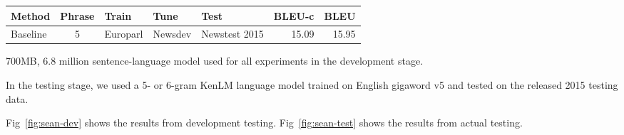 \begin{figure*}
    \begin{center}
        \begin{tabular}{lclllrr}
            \hline
            \textbf{Method} & \textbf{Phrase} & \textbf{Train} & \textbf{Tune} &
            \textbf{Test} & \textbf{BLEU-c} & \textbf{BLEU} \\
            \hline
            Baseline & 5 & Europarl & Newsdev & Newstest 2015 &
            15.09 & 15.95 \\
            \hline
        \end{tabular}
    \caption{Results from the testing stage with Newstest2015 testing data.}
    \label{fig:sean-test}
    \end{center}
\end{figure*}

700MB, 6.8 million sentence-language model used for all experiments in the
development stage.

In the testing stage, we used a 5- or 6-gram KenLM language model trained on
English gigaword v5 and tested on the released 2015 testing data.

Fig~\ref{fig:sean-dev} shows the results from development testing.
Fig~\ref{fig:sean-test} shows the results from actual testing.
